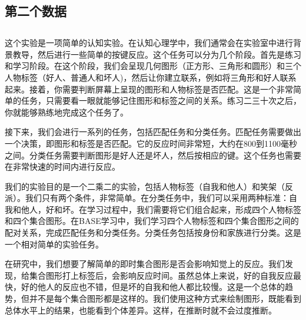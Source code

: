 \documentclass[
  oneside]{book}
\begin{document}
\hypertarget{ux7b2cux4e8cux4e2aux6570ux636e}{%
\subsection{第二个数据}\label{ux7b2cux4e8cux4e2aux6570ux636e}}

\hypertarget{2-data-2}{%
\subsection{}\label{2-data-2}}

这个实验是一项简单的认知实验。在认知心理学中，我们通常会在实验室中进行背景教导，然后进行一些简单的按键反应。这个任务可以分为几个阶段。首先是练习和学习阶段。在这个阶段，我们会呈现几何图形（正方形、三角形和圆形）和三个人物标签（好人、普通人和坏人)，然后让你建立联系，例如将三角形和好人联系起来。接着，你需要判断屏幕上呈现的图形和人物标签是否匹配。这是一个非常简单的任务，只需要看一眼就能够记住图形和标签之间的关系。练习二三十次之后，你就能够熟练地完成这个任务了。

接下来，我们会进行一系列的任务，包括匹配任务和分类任务。匹配任务需要做出一个决策，即图形和标签是否匹配。它的反应时间非常短，大约在800到1100毫秒之间。分类任务需要判断图形是好人还是坏人，然后按相应的键。这个任务也需要在非常快速的时间内进行反应。

我们的实验目的是一个二乘二的实验，包括人物标签（自我和他人）和笑架（反派）。我们只有两个条件，非常简单。在分类任务中，我们可以采用两种标准：自我和他人，好和坏。在学习过程中，我们需要将它们组合起来，形成四个人物标签和四个集合图形。在BASE学习中，我们学习四个人物标签和四个集合图形之间的配对关系，完成匹配任务和分类任务。分类任务包括按身份和家族进行分类。这是一个相对简单的实验任务。

在研究中，我们想要了解简单的即时集合图形是否会影响知觉上的反应。我们发现，给集合图形打上标签后，会影响反应时间。虽然总体上来说，好的自我反应最快，好的他人的反应也不错，但是坏的自我和他人都比较慢。这是一个总体的趋势，但并不是每个集合图形都是这样的。我们使用这种方式来绘制图形，既能看到总体水平上的结果，也能看到个体差异。这样，在推断时就不会过度推断。
\end{document}
